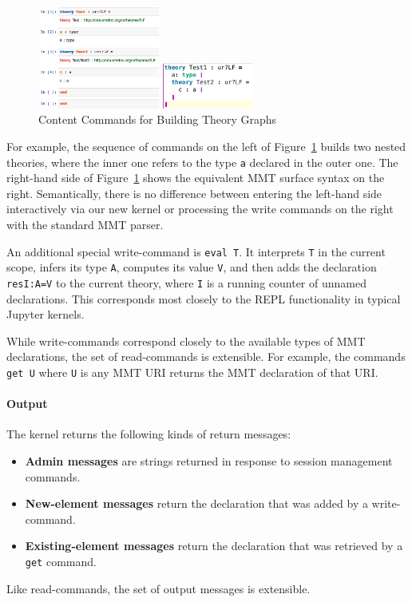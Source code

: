 \begin{figure}
  \vspace{-20pt}
  \begin{minipage}[c]{4cm}\includegraphics[width=4cm]{screenshots/nesting}\end{minipage}
  \begin{minipage}[c]{3cm}\includegraphics[width=3cm]{../D4.11/test_theory}\end{minipage}
  \caption{Content Commands for Building Theory Graphs}\label{fig:test_theory}
  \vspace{-20pt}
\end{figure}

For example, the sequence of commands on the left of Figure~\ref{fig:test_theory} builds two nested theories, where the inner one refers to the type \texttt{a} declared in the outer one.
The right-hand side of Figure~\ref{fig:test_theory} shows the equivalent MMT surface syntax on the right.
Semantically, there is no difference between entering the left-hand side interactively via our new kernel or processing the write commands on the right with the standard MMT parser.

An additional special write-command is \texttt{eval T}.
It interprets \texttt{T} in the current scope, infers its type \texttt{A}, computes its value \texttt{V}, and then adds the declaration \texttt{resI:A=V} to the current theory, where \texttt{I} is a running counter of unnamed declarations.
This corresponds most closely to the REPL functionality in typical Jupyter kernels.

While write-commands correspond closely to the available types of MMT declarations, the set of read-commands is extensible.
For example, the commands \texttt{get U} where \texttt{U} is any MMT URI returns the MMT declaration of that URI.

\paragraph{Output}
The kernel returns the following kinds of return messages:
\begin{itemize}
\item \textbf{Admin messages} are strings returned in response to session management commands.
\item \textbf{New-element messages} return the declaration that was added by a write-command.
\item \textbf{Existing-element messages} return the declaration that was retrieved by a \texttt{get} command.
\end{itemize}
Like read-commands, the set of output messages is extensible.

